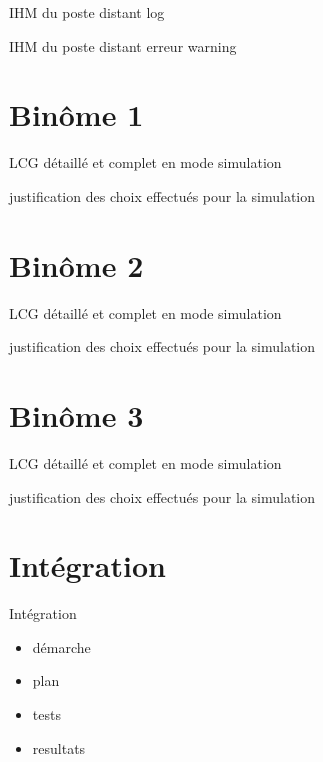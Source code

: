 \documentclass{beamer}
\begin{document}
	\begin{frame}
		IHM du poste distant
		log
	\end{frame}

	\begin{frame}
		IHM du poste distant
		erreur \/ warning
	\end{frame}

\section{Binôme 1}
	\begin{frame}
		LCG détaillé et complet en mode simulation
	\end{frame}

	\begin{frame}
		justification des choix effectués pour la simulation 
	\end{frame}

\section{Binôme 2}
	\begin{frame}
		LCG détaillé et complet en mode simulation
	\end{frame}

	\begin{frame}
		justification des choix effectués pour la simulation  
	\end{frame}

\section{Binôme 3}
	\begin{frame}
		LCG détaillé et complet en mode simulation
	\end{frame}

	\begin{frame}
		justification des choix effectués pour la simulation 
	\end{frame}

\section{Intégration}
	\begin{frame}
		Intégration
		\begin{itemize}
			\item démarche
			\item plan
			\item tests
			\item resultats
		\end{itemize}
	\end{frame}
\end{document}
